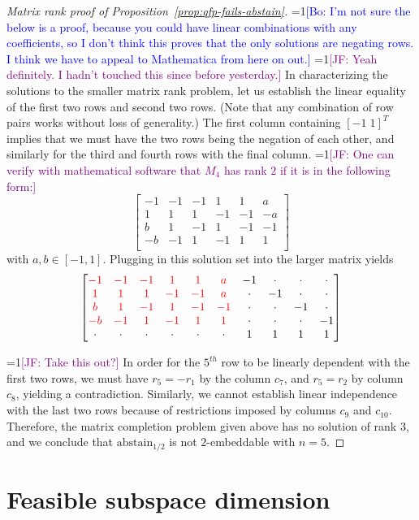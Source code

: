 \documentclass[anon]{colt2020} %
\newcommand{\Comments}{1}
\newcommand{\mynote}[2]{\ifnum\Comments=1\textcolor{#1}{#2}\fi}
\newcommand{\jessie}[1]{\mynote{purple}{[JF: #1]}}
\newcommand{\bo}[1]{\mynote{blue}{[Bo: #1]}}
\newcommand{\abstain}[1]{\mathrm{abstain}_{#1}}
\begin{document}
\begin{proof}[Matrix rank proof of Proposition~\ref{prop:qfp-fails-abstain}]
	\bo{I'm not sure the below is a proof, because you could have linear combinations with any coefficients, so I don't think this proves that the only solutions are negating rows. I think we have to appeal to Mathematica from here on out.}
	\jessie{Yeah definitely.  I hadn't touched this since before yesterday.}
	In characterizing the solutions to the smaller matrix rank problem, let us establish the linear equality of the first two rows and second two rows.
	(Note that any combination of row pairs works without loss of generality.)
	The first column containing $[-1 \; 1]^T$ implies that we must have the two rows being the negation of each other, and similarly for the third and fourth rows with the final column.
	\jessie{One can verify with mathematical software that $M_4$ has rank $2$ if it is in the following form:}
	\[
	\begin{bmatrix}
	-1 & -1 & -1 & 1 & 1 & a \\
	1 & 1 & 1 & -1 & -1 & -a \\
	b & 1 & -1 & 1 & -1 & -1 \\
	-b & -1 & 1 & -1 & 1 & 1 \\
	\end{bmatrix}
	\] with $a, b \in [-1,1]$.
	Plugging in this solution set into the larger matrix yields
	\[
	\begin{bmatrix}
	{\color{red} -1} & {\color{red} -1} & {\color{red} -1} & {\color{red} 1} & {\color{red} 1} & {\color{red} a} & -1 & \cdot & \cdot & \cdot \\
	{\color{red} 1} & {\color{red} 1} & {\color{red} 1} & {\color{red} -1} & {\color{red} -1} & {\color{red} a} & \cdot & -1 & \cdot & \cdot \\
	{\color{red} b} & {\color{red} 1} & {\color{red} -1} & {\color{red} 1} & {\color{red} -1} & {\color{red} -1} & \cdot & \cdot & -1 & \cdot \\
	{\color{red} -b} & {\color{red} -1} & {\color{red} 1} & {\color{red} -1} & {\color{red} 1} & {\color{red} 1} & \cdot & \cdot & \cdot & -1 \\
	\cdot & \cdot & \cdot & \cdot & \cdot & \cdot & 1 & 1 & 1 & 1\\
	\end{bmatrix}
	\]
	
	\jessie{Take this out?}
	In order for the $5^{th}$ row to be linearly dependent with the first two rows, we must have $r_5 = -r_1$ by the column $c_7$, and $r_5 = r_2$ by column $c_8$, yielding a contradiction.
	Similarly, we cannot establish linear independence with the last two rows because of restrictions imposed by columns $c_9$ and $c_{10}$.
	Therefore, the matrix completion problem given above has no solution of rank 3, and we conclude that $\abstain{1/2}$ is not $2$-embeddable with $n=5$.
\end{proof}



\section{Feasible subspace dimension}
\end{document}
